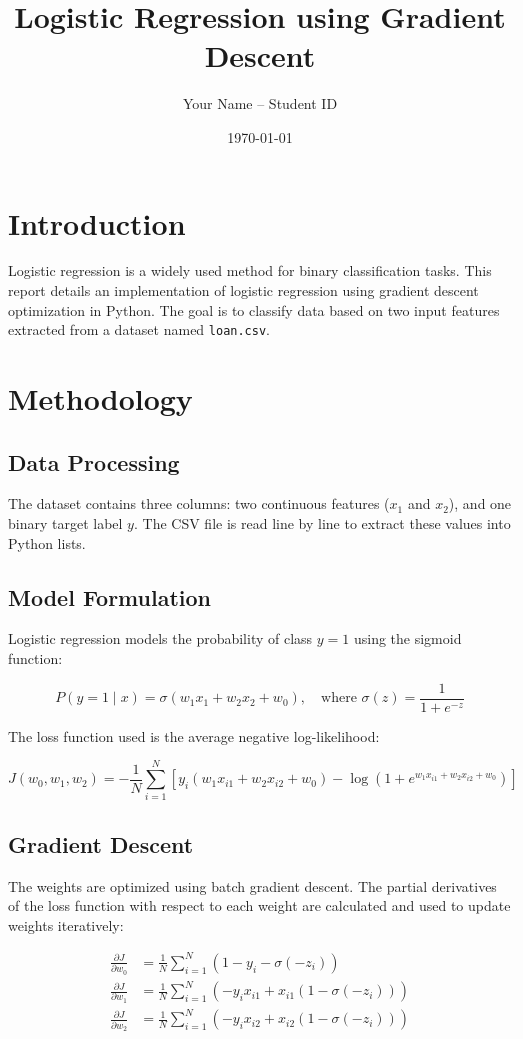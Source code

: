 \documentclass[a4paper, 12pt]{article}
\title{Logistic Regression using Gradient Descent}
\author{Your Name -- Student ID}
\date{\today}
\begin{document}
\maketitle

\section{Introduction}
Logistic regression is a widely used method for binary classification tasks. This report details an implementation of logistic regression using gradient descent optimization in Python. The goal is to classify data based on two input features extracted from a dataset named \texttt{loan.csv}.

\section{Methodology}

\subsection{Data Processing}
The dataset contains three columns: two continuous features ($x_1$ and $x_2$), and one binary target label $y$. The CSV file is read line by line to extract these values into Python lists.

\subsection{Model Formulation}
Logistic regression models the probability of class $y = 1$ using the sigmoid function:

\[
P(y=1 \mid x) = \sigma(w_1 x_1 + w_2 x_2 + w_0), \quad \text{where } \sigma(z) = \frac{1}{1 + e^{-z}}
\]

The loss function used is the average negative log-likelihood:

\[
J(w_0, w_1, w_2) = -\frac{1}{N} \sum_{i=1}^N \left[ y_i (w_1 x_{i1} + w_2 x_{i2} + w_0) - \log(1 + e^{w_1 x_{i1} + w_2 x_{i2} + w_0}) \right]
\]

\subsection{Gradient Descent}
The weights are optimized using batch gradient descent. The partial derivatives of the loss function with respect to each weight are calculated and used to update weights iteratively:

\begin{align*}
\frac{\partial J}{\partial w_0} &= \frac{1}{N} \sum_{i=1}^N \left(1 - y_i - \sigma(-z_i)\right) \\
\frac{\partial J}{\partial w_1} &= \frac{1}{N} \sum_{i=1}^N \left( -y_i x_{i1} + x_{i1}(1 - \sigma(-z_i)) \right) \\
\frac{\partial J}{\partial w_2} &= \frac{1}{N} \sum_{i=1}^N \left( -y_i x_{i2} + x_{i2}(1 - \sigma(-z_i)) \right)
\end{align*}
\end{document}
